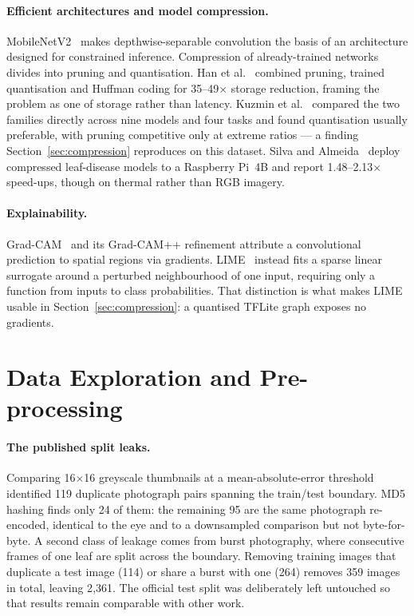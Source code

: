 \documentclass[sigconf,nonacm]{acmart}
\begin{document}
\paragraph{Efficient architectures and model compression.}
MobileNetV2~\cite{sandler2018} makes depthwise-separable convolution the basis of
an architecture designed for constrained inference. Compression of already-trained
networks divides into pruning and quantisation. Han et
al.~\cite{han2016} combined pruning, trained quantisation and Huffman coding for
35--49$\times$ storage reduction, framing the problem as one of storage rather
than latency. Kuzmin et al.~\cite{kuzmin2023} compared the two families directly
across nine models and four tasks and found quantisation usually preferable,
with pruning competitive only at extreme ratios --- a finding
Section~\ref{sec:compression} reproduces on this dataset. Silva and
Almeida~\cite{silva2024} deploy compressed leaf-disease models to a Raspberry
Pi~4B and report 1.48--2.13$\times$ speed-ups, though on thermal rather than RGB
imagery.

\paragraph{Explainability.}
Grad-CAM~\cite{selvaraju2017} and its Grad-CAM++ refinement attribute a
convolutional prediction to spatial regions via gradients.
LIME~\cite{ribeiro2016} instead fits a sparse linear surrogate around a
perturbed neighbourhood of one input, requiring only a function from inputs to
class probabilities. That distinction is what makes LIME usable in
Section~\ref{sec:compression}: a quantised TFLite graph exposes no gradients.

\section{Data Exploration and Pre-processing}
\label{sec:data}

\paragraph{The published split leaks.}
Comparing 16$\times$16 greyscale thumbnails at a mean-absolute-error threshold
identified 119 duplicate photograph pairs spanning the train/test boundary. MD5
hashing finds only 24 of them: the remaining 95 are the same photograph
re-encoded, identical to the eye and to a downsampled comparison but not
byte-for-byte. A second class of leakage comes from burst photography, where
consecutive frames of one leaf are split across the boundary. Removing training
images that duplicate a test image (114) or share a burst with one (264) removes
359 images in total, leaving 2{,}361. The official test split was deliberately
left untouched so that results remain comparable with other work.
\end{document}
